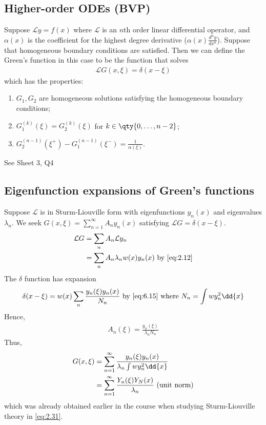 \subsection{Higher-order ODEs (BVP)}
Suppose $\mathcal L y = f(x)$ where $\mathcal L$ is an $n$th order linear differential operator, and $\alpha(x)$ is the coefficient for the highest degree derivative ($\alpha(x) \frac{d^n y}{d x^n}$).
Suppose that homogeneous boundary conditions are satisfied.
Then we can define the Green's function in this case to be the function that solves
\begin{align*}
	\mathcal L G(x,\xi) = \delta(x-\xi)
\end{align*}
which has the properties:
\begin{enumerate}
	\item $G_1, G_2$ are homogeneous solutions satisfying the homogeneous boundary conditions;
	\item $G_1^{(k)}(\xi) = G_2^{(k)}(\xi)$ for $k \in \qty{0, \dots, n-2}$;
	\item $G_2^{(n-1)}(\xi^+) - G_1^{(n-1)}(\xi^-) = \frac{1}{\alpha(\xi)}$.
\end{enumerate}
See Sheet 3, Q4

\subsection{Eigenfunction expansions of Green's functions}
Suppose $\mathcal L$ is in Sturm-Liouville form with eigenfunctions $y_n(x)$ and eigenvalues $\lambda_n$.
We seek $G(x,\xi) = \sum_{n=1}^\infty A_n y_n(x)$ satisfying $\mathcal L G = \delta(x-\xi)$.
\begin{align*}
	\mathcal L G &= \sum_n A_n \mathcal L y_n \\
	&= \sum_n A_n \lambda_n w(x) y_n(x) \text{ by \cref{eq:2.12}}
\end{align*}
The $\delta$ function has expansion
\begin{align*}
	\delta(x-\xi) = w(x) \sum_n \frac{y_n(\xi) y_n(x)}{N_n} \text{ by \cref{eq:6.15} where } N_n = \int w y_n^2 \dd{x}
\end{align*}
Hence,
\begin{align*}
	A_n(\xi) = \frac{y_n(\xi)}{\lambda_n N_n}
\end{align*}
Thus,
\begin{align}
	G(x,\xi) &= \sum_{n=1}^\infty \frac{y_n(\xi) y_n(x)}{\lambda_n \int w y_n^2 \dd{x}} \label{eq:7.23} \\
	&= \sum_{n=1}^\infty \frac{Y_n(\xi) Y_N(x)}{\lambda_n} \text{ (unit norm)} \notag
\end{align}
which was already obtained earlier in the course when studying Sturm-Liouville theory in \cref{eq:2.31}.

